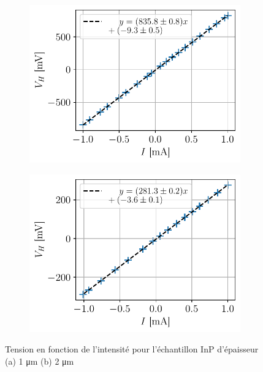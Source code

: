 \begin{figure}[h]
    \centering
    \begin{subfigure}{0.45\textwidth}
        \centering
        \includegraphics[width=\textwidth]{figures/U(I),InP1micro.pdf}
        \caption{}
    \end{subfigure}
    \begin{subfigure}{0.45\textwidth}
        \centering
        \includegraphics[width=\textwidth]{figures/U(I),InP2micro.pdf}
        \caption{}
    \end{subfigure}
    \caption{Tension en fonction de l'intensité pour l'échantillon InP d'épaisseur (a) 1 \si{\micro\meter} (b) 2 \si{\micro\meter}}
    \label{fig:inpV(I)}
\end{figure}

